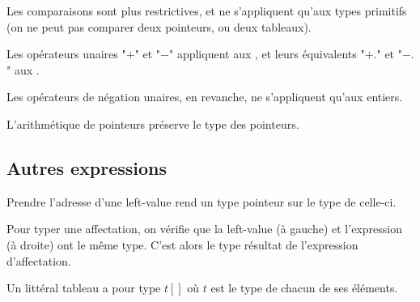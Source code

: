 Les comparaisons sont plus restrictives, et ne s'appliquent qu'aux types
primitifs (on ne peut pas comparer deux pointeurs, ou deux tableaux).

\begin{mathpar}
\end{mathpar}


Les opérateurs unaires "$+$" et "$-$" appliquent aux \tInt, et leurs équivalents
"$+.$" et "$-.$" aux \tFloat.


Les opérateurs de négation unaires, en revanche, ne s'appliquent qu'aux
entiers.

\begin{mathpar}
\end{mathpar}

L'arithmétique de pointeurs préserve le type des pointeurs.

\begin{mathpar}
\end{mathpar}

\subsection*{Autres expressions}

Prendre l'adresse d'une left-value rend un type pointeur sur le type de
celle-ci.

\begin{mathpar}
\end{mathpar}

Pour typer une affectation, on vérifie que la left-value (à gauche) et
l'expression (à droite) ont le même type. C'est alors le type résultat de
l'expression d'affectation.

\begin{mathpar}
\end{mathpar}

Un littéral tableau a pour type $t[]$ où $t$ est le type de chacun de ses
éléments.

\begin{mathpar}
\end{mathpar}

